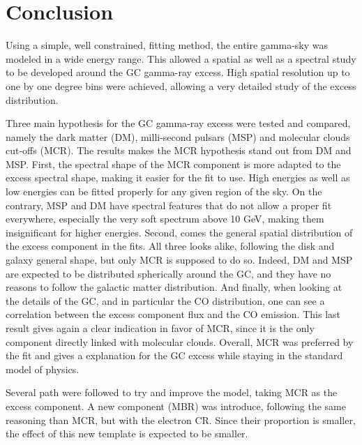 \chapter{Conclusion}
\label{ch:conclusion}

%
%
%
%
%

Using a simple, well constrained, fitting method, the entire gamma-sky was modeled in a wide energy range. This allowed a spatial as well as a spectral study to be developed around the GC gamma-ray excess. High spatial resolution up to one by one degree bins were achieved, allowing a very detailed study of the excess distribution.

Three main hypothesis for the GC gamma-ray excess were tested and compared, namely the dark matter (DM), milli-second pulsars (MSP) and molecular clouds cut-offs (MCR). The results makes the MCR hypothesis stand out from DM and MSP. First, the spectral shape of the MCR component is more adapted to the excess spectral shape, making it easier for the fit to use. High energies as well as low energies can be fitted properly for any given region of the sky. On the contrary, MSP and DM have spectral features that do not allow a proper fit everywhere, especially the very soft spectrum above 10 GeV, making them insignificant for higher energies. Second, comes the general spatial distribution of the excess component in the fits. All three looks alike, following the disk and galaxy general shape, but only MCR is supposed to do so. Indeed, DM and MSP are expected to be distributed spherically around the GC, and they have no reasons to follow the galactic matter distribution. And finally, when looking at the details of the GC, and in particular the CO distribution, one can see a correlation between the excess component flux and the CO emission. This last result gives again a clear indication in favor of MCR, since it is the only component directly linked with molecular clouds. Overall, MCR was preferred by the fit and gives a explanation for the GC excess while staying in the standard model of physics.

Several path were followed to try and improve the model, taking MCR as the excess component. A new component (MBR) was introduce, following the same reasoning than MCR, but with the electron CR. Since their proportion is smaller, the effect of this new template is expected to be smaller.


